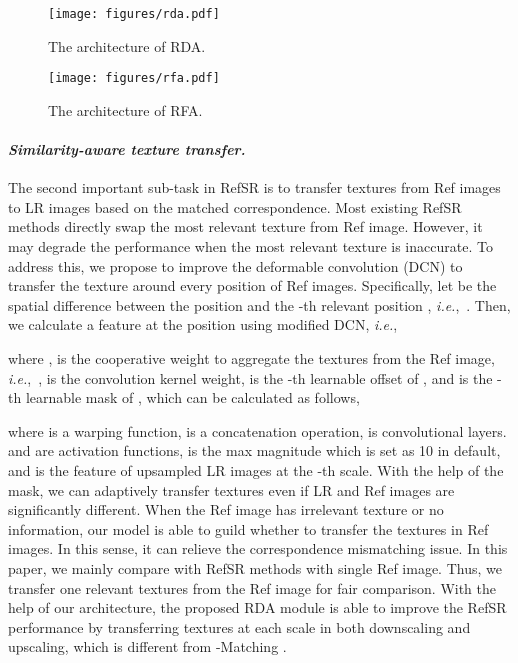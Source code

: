 \documentclass[runningheads]{llncs}
\def\ie{\mbox{\textit{i.e.}, }}
\begin{document}
\begin{figure}[t]
\centering
\begin{minipage}[t]{0.51\textwidth}
\centering
\texttt{[image: figures/rda.pdf]}
\caption{The architecture of RDA.}
\label{fig:rda}
\end{minipage}
\begin{minipage}[t]{0.44\textwidth}
\centering
\texttt{[image: figures/rfa.pdf]}
\caption{The architecture of RFA.}
\label{fig:rfa}
\end{minipage}
\end{figure}


\paragraph{\textbf{\emph{Similarity-aware texture transfer.}}}
The second important sub-task in RefSR is to transfer textures from Ref images to LR images based on the matched correspondence.
Most existing RefSR methods \cite{zhang2019image,yang2020learning} directly swap the most relevant texture from Ref image.
However, it may degrade the performance when the most relevant texture is inaccurate. 
To address this, we propose to improve the deformable convolution (DCN) \cite{dai2017deformable,zhu2019deformable} to transfer the texture around every position  of Ref images. 
Specifically, let  be the spatial difference between the position  and the -th relevant position , \ie .
Then, we calculate a feature at the position  using modified DCN, \ie

where ,  is the cooperative weight to aggregate the  textures from the Ref image, \ie ,  is the convolution kernel weight,  is the -th learnable offset of , and  is the -th learnable mask of , which can be calculated as follows,

where  is a warping function,  is a concatenation operation,  is convolutional layers.
 and  are activation functions,  is the max magnitude which is set as 10 in default, and  is the feature of upsampled LR images at the -th scale. 
With the help of the mask, we can adaptively transfer textures even if LR and Ref images are significantly different.  
When the Ref image has irrelevant texture or no information, our model is able to guild whether to transfer the textures in Ref images. 
In this sense, it can relieve the correspondence mismatching issue. 
In this paper, we mainly compare with RefSR methods with single Ref image.
Thus, we transfer one relevant textures from the Ref image for fair comparison.
With the help of our architecture, the proposed RDA module is able to improve the RefSR performance by transferring textures at each scale in both downscaling and upscaling, which is different from -Matching \cite{jiang2021robust}.
\end{document}
